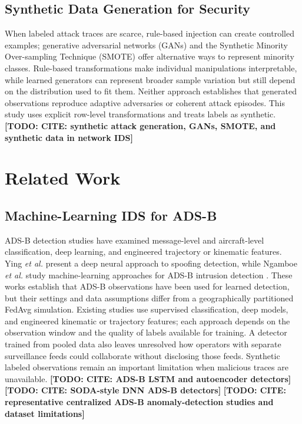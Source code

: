 \documentclass[conference]{IEEEtran}
\newcommand{\todo}[1]{\textbf{[TODO: #1]}}
\begin{document}
\subsection{Synthetic Data Generation for Security}

When labeled attack traces are scarce, rule-based injection can create controlled examples; generative adversarial networks (GANs) and the Synthetic Minority Over-sampling Technique (SMOTE) offer alternative ways to represent minority classes. Rule-based transformations make individual manipulations interpretable, while learned generators can represent broader sample variation but still depend on the distribution used to fit them. Neither approach establishes that generated observations reproduce adaptive adversaries or coherent attack episodes. This study uses explicit row-level transformations and treats labels as synthetic. \todo{CITE: synthetic attack generation, GANs, SMOTE, and synthetic data in network IDS}



\section{Related Work}

\subsection{Machine-Learning IDS for ADS-B}

ADS-B detection studies have examined message-level and aircraft-level classification, deep learning, and engineered trajectory or kinematic features. Ying \emph{et al.} present a deep neural approach to spoofing detection, while Ngamboe \emph{et al.} study machine-learning approaches for ADS-B intrusion detection \cite{ying2019,ngamboe2025}. These works establish that ADS-B observations have been used for learned detection, but their settings and data assumptions differ from a geographically partitioned FedAvg simulation. Existing studies use supervised classification, deep models, and engineered kinematic or trajectory features; each approach depends on the observation window and the quality of labels available for training. A detector trained from pooled data also leaves unresolved how operators with separate surveillance feeds could collaborate without disclosing those feeds. Synthetic labeled observations remain an important limitation when malicious traces are unavailable. \todo{CITE: ADS-B LSTM and autoencoder detectors} \todo{CITE: SODA-style DNN ADS-B detectors} \todo{CITE: representative centralized ADS-B anomaly-detection studies and dataset limitations}
\end{document}
